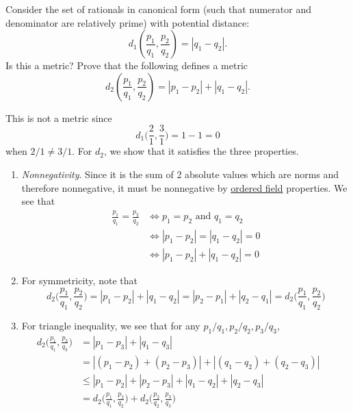   \begin{exercise}
    Consider the set of rationals in canonical form (such that numerator and denominator are relatively prime) with potential distance:
    \begin{equation}
      d_1(\frac{p_1}{q_1}, \frac{p_2}{q_2}) = |q_1 - q_2|.
    \end{equation}
    Is this a metric? Prove that the following defines a metric
    \begin{equation}
      d_2(\frac{p_1}{q_1}, \frac{p_2}{q_2}) = |p_1 - p_2| + |q_1 - q_2|.
    \end{equation}
  \end{exercise} 
  \begin{solution}
    This is not a metric since 
    \begin{equation}
      d_1 \bigg( \frac{2}{1}, \frac{3}{1} \bigg) = 1 - 1 = 0
    \end{equation} 
    when $2/1 \neq 3/1$. For $d_2$, we show that it satisfies the three properties. 
    \begin{enumerate}
      \item \textit{Nonnegativity}. Since it is the sum of 2 absolute values which are norms and therefore nonnegative, it must be nonnegative by \hyperref[alg-def:ordered-field]{ordered field} properties. We see that 
      \begin{align}
        \frac{p_1}{q_1} = \frac{p_2}{q_2} & \iff p_1 = p_2 \text{ and } q_1 = q_2 \\
                                          & \iff |p_1 - p_2| = |q_1 - q_2| = 0 \\
                                          & \iff |p_1 - p_2| + |q_1 - q_2| = 0 
      \end{align}

      \item For symmetricity, note that 
        \begin{equation}
          d_2 \bigg( \frac{p_1}{q_1} , \frac{p_2}{q_2} \bigg) = |p_1 - p_2| + |q_1 - q_2| = |p_2 - p_1| + |q_2 - q_1| = d_2 \bigg( \frac{p_1}{q_1} , \frac{p_2}{q_2} \bigg)
        \end{equation}

        \item For triangle inequality, we see that for any $p_1/q_1, p_2/q_2, p_3/q_3$, 
        \begin{align}
          d_2 \bigg( \frac{p_1}{q_1}, \frac{p_3}{q_3} \bigg) & = |p_1 - p_3| + |q_1 - q_3| \\
                                                             & = |(p_1 - p_2) + (p_2 - p_3)| + |(q_1 - q_2) + (q_2 - q_3)| \\
                                                             & \leq |p_1 - p_2| + |p_2 - p_3| + |q_1 - q_2| + |q_2 - q_3| && \tag{subadditivity of norm} \\
                                                             & = d_2 \bigg( \frac{p_1}{q_1}, \frac{p_2}{q_2} \bigg) + d_2 \bigg( \frac{p_2}{q_2}, \frac{p_3}{q_3} \bigg) 
        \end{align}
    \end{enumerate}
  \end{solution}

